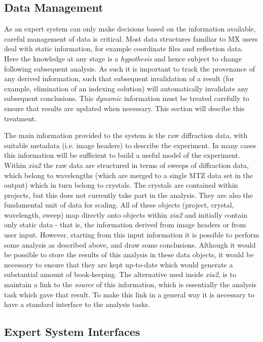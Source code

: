 \documentclass[preprint,pdf]{iucr}
\begin{document}
\subsection{Data Management}

As an expert system can only make decisions based on the information
available, careful management of data is critical. Most data structures
familiar to MX users deal with static
information, for example coordinate files and reflection data. Here 
the knowledge at any stage is a \emph{hypothesis} and hence
subject to change following subsequent analysis. As such it is
important to track the provenance of any derived information, such
that subsequent invalidation of a result (for example, elimination of
an indexing solution) will automatically invalidate any subsequent
conclusions. This \emph{dynamic} information must be treated carefully
to ensure that results are updated when necessary. This section will
descibe this treatment.

The main information provided to the system is the raw diffraction
data, with suitable metadata (i.e. image headers) to describe the
experiment. In many cases this information will be sufficient to build
a useful model of the experiment. Within \emph{xia2} the raw data are
structured in terms of sweeps of diffraction data, which belong to
wavelengths (which are merged to a single MTZ data set in the output)
which in turn belong to crystals. The crystals are contained within
projects, but this does not currently take part in the analysis. They
are also the fundamental unit of data for scaling. All of these
objects (project, crystal, wavelength, sweep) map directly onto
objects within \emph{xia2} and initially contain only static data -
that is, the information derived from image headers or from user
input. However, starting from this input information it is possible to
perform some analysis as described above, and draw some
conclusions. Although it would be possible to store the results of
this analysis in these data objects, it would be necessary to ensure
that they are kept up-to-date which would generate a substantial
amount of book-keeping. The alternative used inside
\emph{xia2}, is to maintain a link to the
\emph{source} of this information, which is essentially the analysis
task which gave that result. To make this link in a general
way it is necessary to have a standard interface to the analysis
tasks.

\subsection{Expert System Interfaces}
\end{document}
